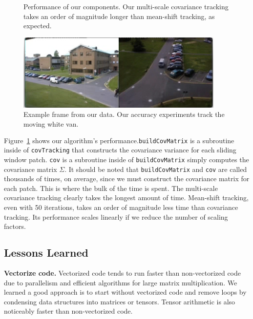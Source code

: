 \documentclass{article}
\begin{document}
\begin{figure}[t]
\centering
{}
\caption{Performance of our components. Our multi-scale covariance tracking takes an order of magnitude longer than mean-shift tracking, as expected.}\label{fig:perf}
\end{figure}

\begin{figure}[t]
\centering
\includegraphics{dataset.png}
\caption{Example frame from our data. Our accuracy experiments track the moving white van.}\label{fig:dataset}
\end{figure}

Figure~\ref{fig:perf} shows our algorithm's performance.\texttt{buildCovMatrix} is a subroutine inside of \texttt{covTracking} that constructs the covariance variance for each sliding window patch. \texttt{cov} is a subroutine inside of \texttt{buildCovMatrix} simply computes the covariance matrix $\Sigma$. It should be noted that \texttt{buildCovMatrix} and \texttt{cov} are called thousands of times, on average, since we must construct the covariance matrix for each patch. This is where the bulk of the time is spent. The multi-scale covariance tracking clearly takes the longest amount of time. Mean-shift tracking, even with 50 iterations, takes an order of magnitude less time than covariance tracking. Its performance scales linearly if we reduce the number of scaling factors.

\subsection{Lessons Learned}
\vspace{5pt}
\noindent\textbf{Vectorize code.} Vectorized code tends to run faster than non-vectorized code due to parallelism and efficient algorithms for large matrix multiplication. We learned a good approach is to start without vectorized code and remove loops by condensing data structures into matrices or tensors. Tensor arithmetic is also noticeably faster than non-vectorized code.
\end{document}
